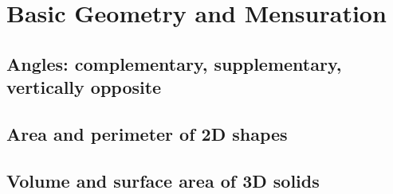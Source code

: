 
\section{Basic Geometry and Mensuration}

\subsection{Angles: complementary, supplementary, vertically opposite}


\subsection{Area and perimeter of 2D shapes}


\subsection{Volume and surface area of 3D solids}

